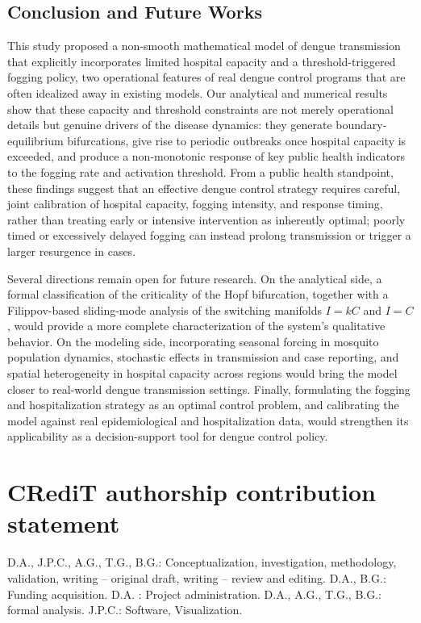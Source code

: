 \documentclass[preprint]{elsarticle}
\begin{document}
\subsection{Conclusion and Future Works}

This study proposed a non-smooth mathematical model of dengue transmission that explicitly incorporates limited hospital capacity and a threshold-triggered fogging policy, two operational features of real dengue control programs that are often idealized away in existing models. Our analytical and numerical results show that these capacity and threshold constraints are not merely operational details but genuine drivers of the disease dynamics: they generate boundary-equilibrium bifurcations, give rise to periodic outbreaks once hospital capacity is exceeded, and produce a non-monotonic response of key public health indicators to the fogging rate and activation threshold. From a public health standpoint, these findings suggest that an effective dengue control strategy requires careful, joint calibration of hospital capacity, fogging intensity, and response timing, rather than treating early or intensive intervention as inherently optimal; poorly timed or excessively delayed fogging can instead prolong transmission or trigger a larger resurgence in cases.

Several directions remain open for future research. On the analytical side, a formal classification of the criticality of the Hopf bifurcation, together with a Filippov-based sliding-mode analysis of the switching manifolds $I=kC$ and $I=C$, would provide a more complete characterization of the system's qualitative behavior. On the modeling side, incorporating seasonal forcing in mosquito population dynamics, stochastic effects in transmission and case reporting, and spatial heterogeneity in hospital capacity across regions would bring the model closer to real-world dengue transmission settings. Finally, formulating the fogging and hospitalization strategy as an optimal control problem, and calibrating the model against real epidemiological and hospitalization data, would strengthen its applicability as a decision-support tool for dengue control policy.





\section*{CRediT authorship contribution statement}
D.A., J.P.C., A.G., T.G., B.G.: Conceptualization, investigation, methodology, validation, writing – original draft, writing – review and editing. D.A., B.G.: Funding acquisition. D.A. : Project administration. D.A., A.G., T.G., B.G.: formal analysis.  J.P.C.: Software, Visualization.
\end{document}
